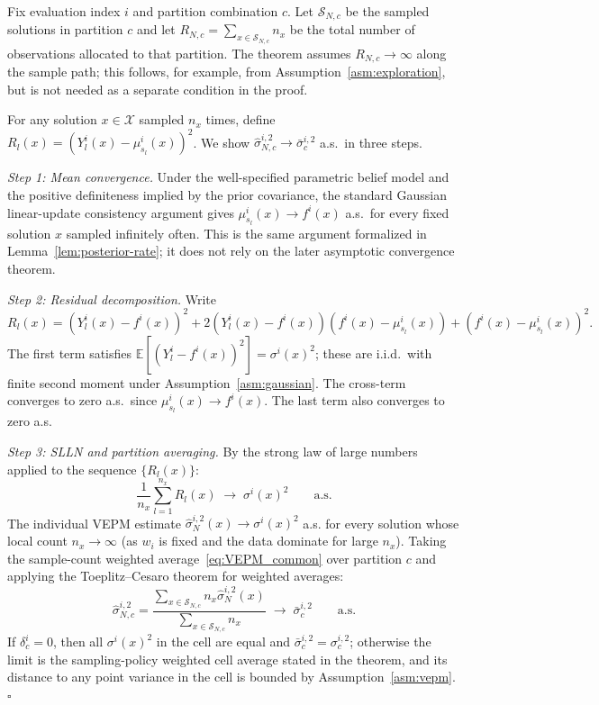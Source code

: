 \documentclass[12pt]{article}
\theoremstyle{plain}
\theoremstyle{definition}
\theoremstyle{remark}
\begin{document}
Fix evaluation index $i$ and partition combination $c$.
Let $\mathcal{S}_{N,c}$ be the sampled solutions in partition $c$ and
let $R_{N,c}=\sum_{x\in\mathcal{S}_{N,c}} n_x$ be the total number of
observations allocated to that partition.  The theorem assumes
$R_{N,c}\to\infty$ along the sample path; this follows, for example,
from Assumption~\ref{asm:exploration}, but is not needed as a separate
condition in the proof.

For any solution $x \in \mathcal{X}$ sampled $n_x$ times, define
$R_l(x) = (Y^i_l(x) - \mu^i_{s_l}(x))^2$.  We show
$\hat{\sigma}^{i,2}_{N,c} \to \bar{\sigma}^{i,2}_c$ a.s.\ in three steps.

\emph{Step 1: Mean convergence.}
Under the well-specified parametric belief model and the positive
definiteness implied by the prior covariance, the standard Gaussian
linear-update consistency argument gives
$\mu^i_{s_l}(x) \to f^i(x)$ a.s.\ for every fixed solution $x$ sampled
infinitely often.  This is the same argument formalized in
Lemma~\ref{lem:posterior-rate}; it does not rely on the later
asymptotic convergence theorem.

\emph{Step 2: Residual decomposition.}
Write
\[
  R_l(x) = (Y^i_l(x) - f^i(x))^2
            + 2(Y^i_l(x) - f^i(x))(f^i(x) - \mu^i_{s_l}(x))
            + (f^i(x) - \mu^i_{s_l}(x))^2.
\]
The first term satisfies $\mathbb{E}[(Y^i_l - f^i(x))^2] = \sigma^i(x)^2$;
these are i.i.d.\ with finite second moment under Assumption~\ref{asm:gaussian}.
The cross-term converges to zero a.s.\ since $\mu^i_{s_l}(x) \to f^i(x)$.
The last term also converges to zero a.s.

\emph{Step 3: SLLN and partition averaging.}
By the strong law of large numbers applied to the sequence $\{R_l(x)\}$:
\[
  \frac{1}{n_x} \sum_{l=1}^{n_x} R_l(x) \;\longrightarrow\; \sigma^i(x)^2
  \qquad \text{a.s.}
\]
The individual VEPM estimate $\hat{\sigma}^{i,2}_N(x) \to \sigma^i(x)^2$ a.s.
for every solution whose local count $n_x\to\infty$ (as $w_i$ is fixed
and the data dominate for large $n_x$).  Taking the sample-count
weighted average~\eqref{eq:VEPM_common} over partition $c$ and applying
the Toeplitz--Cesaro theorem for weighted averages:
\[
  \hat{\sigma}^{i,2}_{N,c}
  = \frac{\sum_{x \in \mathcal{S}_{N,c}} n_x\hat{\sigma}^{i,2}_N(x)}
         {\sum_{x \in \mathcal{S}_{N,c}} n_x}
  \;\longrightarrow\; \bar{\sigma}^{i,2}_c
  \qquad \text{a.s.}
\]
If $\delta_c^i=0$, then all $\sigma^i(x)^2$ in the cell are equal and
$\bar{\sigma}^{i,2}_c=\sigma^{i,2}_c$; otherwise the limit is the
sampling-policy weighted cell average stated in the theorem, and its
distance to any point variance in the cell is bounded by
Assumption~\ref{asm:vepm}.
\hfill$\square$
\end{document}
